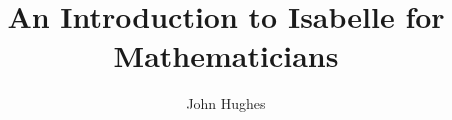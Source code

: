 \documentclass[11pt,notitlepage,openany,oneside]{book}
\begin{document}
\title{An Introduction to Isabelle for Mathematicians}
\author{John Hughes}
\maketitle  

\tableofcontents







%
%



\end{document}
